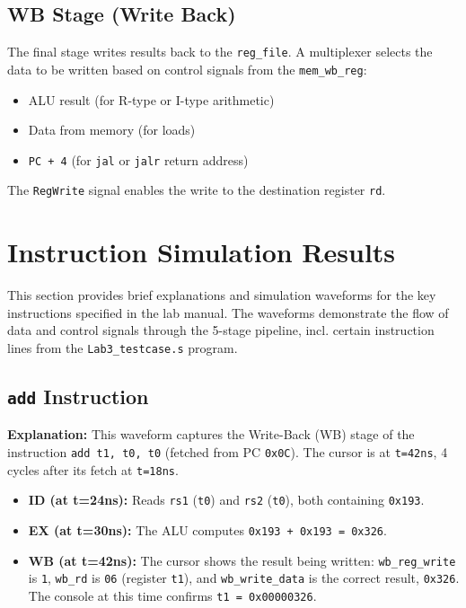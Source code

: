 \documentclass{article}
\begin{document}
\subsection{WB Stage (Write Back)}
The final stage writes results back to the \texttt{reg\_file}. A multiplexer selects the data to be written based on control signals from the \texttt{mem\_wb\_reg}:
\begin{itemize}
    \item ALU result (for R-type or I-type arithmetic)
    \item Data from memory (for loads)
    \item \texttt{PC + 4} (for \texttt{jal} or \texttt{jalr} return address)
\end{itemize}
The \texttt{RegWrite} signal enables the write to the destination register \texttt{rd}.

\section{Instruction Simulation Results}

This section provides brief explanations and simulation waveforms for the key instructions specified in the lab manual. The waveforms demonstrate the flow of data and control signals through the 5-stage pipeline, incl. certain instruction lines from the \texttt{Lab3\_testcase.s} program.

\subsection{\texttt{add} Instruction}
\textbf{Explanation:} This waveform captures the Write-Back (WB) stage of the instruction \texttt{add t1, t0, t0} (fetched from PC \texttt{0x0C}). The cursor is at \texttt{t=42ns}, 4 cycles after its fetch at \texttt{t=18ns}.
\begin{itemize}
    \item \textbf{ID (at t=24ns):} Reads \texttt{rs1} (\texttt{t0}) and \texttt{rs2} (\texttt{t0}), both containing \texttt{0x193}.
    \item \textbf{EX (at t=30ns):} The ALU computes \texttt{0x193 + 0x193 = 0x326}.
    \item \textbf{WB (at t=42ns):} The cursor shows the result being written: \texttt{wb\_reg\_write} is \texttt{1}, \texttt{wb\_rd} is \texttt{06} (register \texttt{t1}), and \texttt{wb\_write\_data} is the correct result, \texttt{0x326}. The console at this time confirms \texttt{t1 = 0x00000326}.
\end{itemize}
\end{document}
